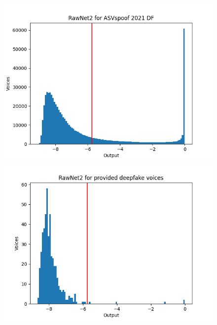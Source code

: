 \begin{figure}
    \centering
    \begin{minipage}[b]{0.45\hsize}
        \centering
        \includegraphics[width=\linewidth]{figures/rawnet2_asv.png} 
        \subcaption{}
    \end{minipage}
    \begin{minipage}[b]{0.45\hsize}
        \centering
        \includegraphics[width=\linewidth]{figures/rawnet2_prop.png}
        \subcaption{}
    \end{minipage}\\
    \begin{minipage}[b]{0.45\hsize}
        \centering

\end{minipage}
\end{figure}
